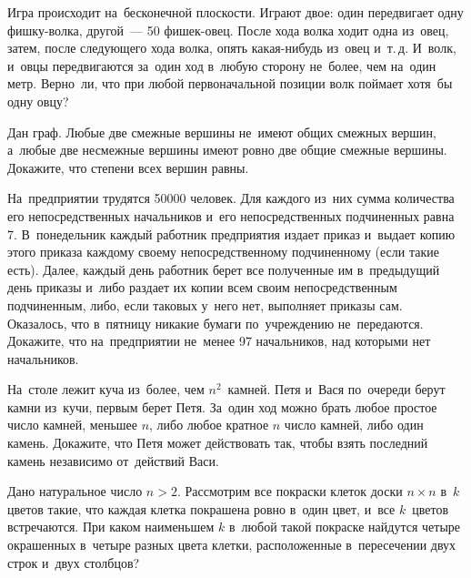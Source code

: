 


\begin{problems}

\item
Игра происходит на~бесконечной плоскости.
Играют двое: один передвигает одну фишку-волка, другой~--- 50 фишек-овец.
После хода волка ходит одна из~овец, затем, после следующего хода волка, опять
какая-нибудь из~овец и~т.\,д.
И~волк, и~овцы передвигаются за~один ход в~любую сторону не~более, чем на~один метр.
Верно~ли, что при любой первоначальной позиции волк поймает хотя~бы одну овцу?

\item
Дан граф.
Любые две смежные вершины не~имеют общих смежных вершин, а~любые две несмежные
вершины имеют ровно две общие смежные вершины.
Докажите, что степени всех вершин равны.

\item
На~предприятии трудятся 50000 человек.
Для каждого из~них сумма количества его непосредственных начальников и~его
непосредственных подчиненных равна 7.
В~понедельник каждый работник предприятия издает приказ и~выдает копию этого
приказа каждому своему непосредственному подчиненному (если такие есть).
Далее, каждый день работник берет все полученные им в~предыдущий день приказы
и~либо раздает их копии всем своим непосредственным подчиненным, либо, если
таковых у~него нет, выполняет приказы сам.
Оказалось, что в~пятницу никакие бумаги по~учреждению не~передаются.
Докажите, что на~предприятии не~менее 97 начальников, над которыми нет
начальников.

\item
На~столе лежит куча из~более, чем $n^2$~камней.
Петя и~Вася по~очереди берут камни из~кучи, первым берет Петя.
За~один ход можно брать любое простое число камней, меньшее $n$, либо любое
кратное $n$ число камней, либо один камень.
Докажите, что Петя может действовать так, чтобы взять последний камень
независимо от~действий Васи.

\item
Дано натуральное число $n > 2$.
Рассмотрим все покраски клеток доски $n \times n$ в~$k$ цветов такие, что
каждая клетка покрашена ровно в~один цвет, и~все $k$~цветов встречаются.
При каком наименьшем $k$ в~любой такой покраске найдутся четыре окрашенных
в~четыре разных цвета клетки, расположенные в~пересечении двух строк и~двух
столбцов?


\end{problems}
